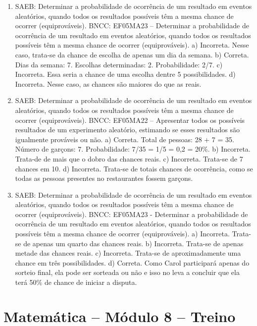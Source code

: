 \begin{enumerate}
\item
SAEB: Determinar a probabilidade de ocorrência de um resultado em eventos aleatórios, quando todos os resultados possíveis têm a mesma chance de ocorrer (equiprováveis).
BNCC: EF05MA23 – Determinar a probabilidade de ocorrência de um resultado em eventos aleatórios,
quando todos os resultados possíveis têm a mesma chance de ocorrer (equiprováveis).
a) Incorreta. Nesse caso, trata-se da chance de escolha de apenas um dia da semana.
b) Correta. 
Dias da semana: 7.
Escolhas determinadas: 2.
Probabilidade: 2/7.
c) Incorreta. Essa seria a chance de uma escolha dentre 5 possibilidades.
d) Incorreta. Nesse caso, as chances são maiores do que as reais.

\item
SAEB: Determinar a probabilidade de ocorrência de um resultado em eventos aleatórios, quando todos os resultados possíveis têm a mesma chance de ocorrer (equiprováveis).
BNCC: EF05MA22 – Apresentar todos os possíveis resultados de um experimento aleatório,
estimando se esses resultados são igualmente prováveis ou não.
a) Correta. 
Total de pessoas: 28 + 7 = 35.
Número de garçons: 7.
Probabilidade: 7/35 = 1/5 = 0,2 = 20\%.
b) Incorreta. Trata-de de mais que o dobro das chances reais.
c) Incorreta. Trata-se de 7 chances em 10.
d) Incorreta. Trata-se de totais chances de ocorrência, como se todas as pessoas presentes no restaurantes fossem garçons.

\item
SAEB: Determinar a probabilidade de ocorrência de um resultado em eventos aleatórios, quando todos os resultados possíveis têm a mesma chance de ocorrer (equiprováveis).
BNCC: EF05MA23 - Determinar a probabilidade de ocorrência de um resultado em eventos aleatórios,
quando todos os resultados possíveis têm a mesma chance de ocorrer (equiprováveis).
a) Incorreta. Trata-se de apenas um quarto das chances reais.
b) Incorreta. Trata-se de apenas metade das chances reais.
c) Incorreta. Trata-se de aproximadamente uma chance em três possibilidades.
d) Correta. Como Carol participará apenas do sorteio final, ela pode ser sorteada ou
não e isso no leva a concluir que ela terá 50\% de chance de iniciar a
disputa.
\end{enumerate}

\section*{Matemática -- Módulo 8 -- Treino}

